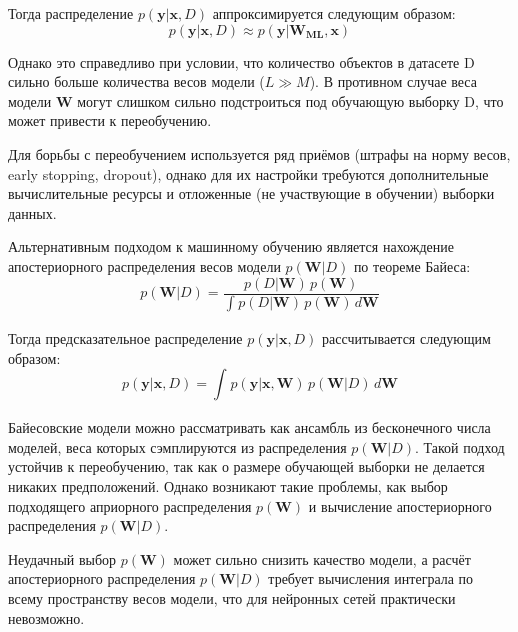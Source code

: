 \documentclass{article}
\numberwithin{equation}{section}
\begin{document}
    Тогда распределение $p(\pmb{y} | \pmb{x}, D)$ аппроксимируется следующим образом:
    \begin{equation}
        p(\pmb{y} | \pmb{x}, D) \approx p(\pmb{y} |\pmb{W_{ML}}, \pmb{x})
    \end{equation}

    Однако это справедливо при условии, что количество объектов в датасете D
    сильно больше количества весов модели ($L \gg M$).
    В противном случае веса модели $\pmb{W}$ могут слишком сильно подстроиться
    под обучающую выборку D, что может привести к переобучению.

    Для борьбы с переобучением используется ряд приёмов (штрафы на норму весов, early stopping, dropout),
    однако для их настройки требуются дополнительные вычислительные ресурсы
    и отложенные (не участвующие в обучении) выборки данных.

    Альтернативным подходом к машинному обучению является нахождение апостериорного распределения весов модели $p(\pmb{W}| D)$ по теореме Байеса:
    \begin{equation}
        p(\pmb{W}| D)
        =
        \frac
            {
                p(D | \pmb{W})
                \,
                p(\pmb{W})
            }
            {
                \int_{}{
                    p(D | \pmb{W})
                    \,
                    p(\pmb{W})
                    \,
                    d\pmb{W}
                }
            }
    \end{equation}

    Тогда предсказательное распределение $p(\pmb{y} | \pmb{x}, D)$ рассчитывается следующим образом:
    \begin{equation}
        p(\pmb{y} | \pmb{x}, D)
        =
        \int_{}{
            p(\pmb{y} | \pmb{x}, \pmb{W})
            \,
            p(\pmb{W} | D)
            \,
            d\pmb{W}
        }
    \end{equation}

    Байесовские модели можно рассматривать как ансамбль из бесконечного числа моделей,
    веса которых сэмплируются из распределения
    $p(\pmb{W}| D)$.
    Такой подход устойчив к переобучению, так как о размере обучающей выборки не делается никаких предположений.
    Однако возникают такие проблемы, как выбор подходящего априорного распределения
    $p(\pmb{W})$
    и вычисление апостериорного распределения
    $p(\pmb{W}| D)$.

    Неудачный выбор $p(\pmb{W})$ может сильно снизить качество модели,
    а расчёт апостериорного распределения $p(\pmb{W}| D)$
    требует вычисления интеграла по всему пространству весов модели,
    что для нейронных сетей практически невозможно.
\end{document}
